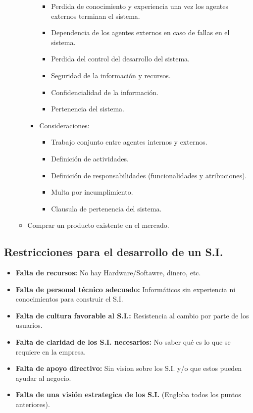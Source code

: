 \documentclass{templateNote}
\begin{document}
\begin{itemize}
\begin{itemize}
\begin{itemize}
            \begin{itemize}
                \item Perdida de conocimiento y experiencia una vez los agentes externos terminan el sistema.
                \item Dependencia de los agentes externos en caso de fallas en el sistema.
                \item Perdida del control del desarrollo del sistema.
                \item Seguridad de la información y recursos.
                \item Confidencialidad de la información.
                \item Pertenencia del sistema.
            \end{itemize}
            \item Consideraciones:
            \begin{itemize}
                \item Trabajo conjunto entre agentes internos y externos.
                \item Definición de actividades.
                \item Definición de responsabilidades (funcionalidades y atribuciones).
                \item Multa por incumplimiento.
                \item Clausula de pertenencia del sistema.
            \end{itemize}
        \end{itemize}
        \item Comprar un producto existente en el mercado.
    \end{itemize}
\end{itemize}

\subsection{Restricciones para el desarrollo de un S.I.}
\begin{itemize}
    \item \textbf{Falta de recursos:} No hay Hardware/Softawre, dinero, etc.
    
    \item \textbf{Falta de personal t\'ecnico adecuado:} Inform\'aticos sin experiencia ni conocimientos para construir el S.I.
    
    \item \textbf{Falta de cultura favorable al S.I.:} Resistencia al cambio por parte de los usuarios.
    
    \item \textbf{Falta de claridad de los S.I. necesarios:} No saber qu\'e es lo que se requiere en la empresa.
    
    \item \textbf{Falta de apoyo directivo:} Sin visi\;on sobre los S.I. y/o que estos pueden ayudar al negocio.
    
    \item \textbf{Falta de una visi\'on estrategica de los S.I.} (Engloba todos los puntos anteriores).
\end{itemize}
\end{document}

